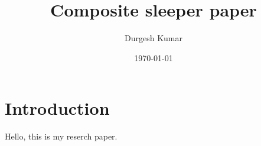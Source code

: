 \documentclass{article}
\title{Composite sleeper paper}
\author{Durgesh Kumar}
\date{\today}
\begin{document}
\maketitle

\section{Introduction}

Hello, this is my reserch paper.
\end{document}
